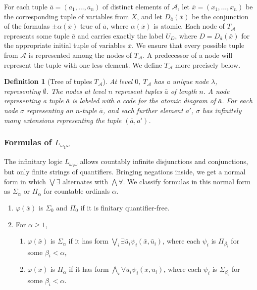 \documentclass{article}
\newtheorem{defn}{Definition}
\begin{document}
For each tuple $\bar{a} = (a_1,\ldots,a_n)$ of distinct elements of $\mathcal{A}$, let $\bar{x} = (x_1,\ldots,x_n)$ be the corresponding tuple of variables from $X$, and let $D_{\bar{a}}(\bar{x})$ be the conjunction of the formulas $\pm\alpha(\bar{x})$ true of $\bar{a}$, where $\alpha(\bar{x})$ is atomic. Each node of $T_\mathcal{A}$ represents some tuple $\bar{a}$ and carries exactly the label $U_D$, where $D = D_{\bar{a}}(\bar{x})$ for the appropriate initial tuple of variables $\bar{x}$. We ensure that every possible tuple from $\mathcal{A}$ is represented among the nodes of $T_\mathcal{A}$. A predecessor of a node will represent the tuple with one less element.  We define $T_\mathcal{A}$ more precisely below.            

\begin{defn} [Tree of tuples $T_\mathcal{A}$]

At level $0$, $T_\mathcal{A}$ has a unique node $\lambda$, representing $\emptyset$. The nodes at level $n$ represent tuples $\bar{a}$ of length $n$. A node representing a tuple $\bar{a}$ is labeled with a code for the atomic diagram of $\bar{a}$. For each node $\sigma$ representing an $n$-tuple $\bar{a}$, and each further element $a'$, $\sigma$ has infinitely many extensions representing the tuple $(\bar{a},a')$.         

\end{defn}

\subsubsection{Formulas of $L_{\omega_1\omega}$}

The infinitary logic $L_{\omega_1\omega}$ allows countably infinite disjunctions and conjunctions, but only finite strings of quantifiers.  Bringing negations inside, we get a normal form in which $\bigvee\exists$ alternates with $\bigwedge\forall$.  We classify formulas in this normal form as $\Sigma_\alpha$ or $\Pi_\alpha$ for countable ordinals $\alpha$.

\begin{enumerate}
    
\item $\varphi(\bar{x})$ is $\Sigma_0$ and $\Pi_0$ if it is finitary quantifier-free.

\item  For $\alpha\geq 1$, 

\begin{enumerate} 
    
\item  $\varphi(\bar{x})$ is $\Sigma_\alpha$ if it has form $\bigvee_i\exists\bar{u}_i\psi_i(\bar{x},\bar{u}_i)$, where each $\psi_i$ is $\Pi_{\beta_i}$ for some $\beta_i < \alpha$,   

\item  $\varphi(\bar{x})$ is $\Pi_\alpha$ if it has form $\bigwedge_i\forall\bar{u}_i\psi_i(\bar{x},\bar{u}_i)$, where each $\psi_i$ is $\Sigma_{\beta_i}$ for some $\beta_i < \alpha$.

\end{enumerate}
\end{enumerate}
\end{document}
